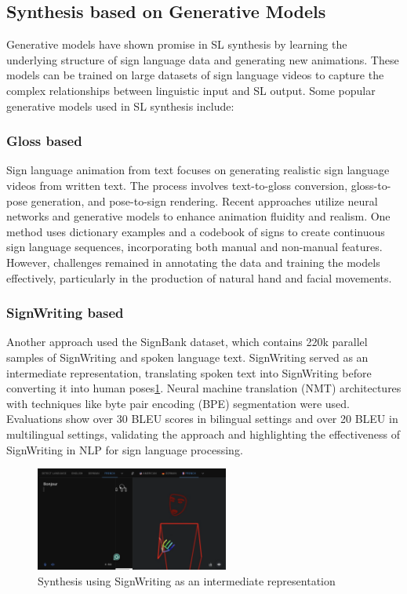 \documentclass[../../main.tex]{subfiles}
\begin{document}
\subsection{Synthesis based on Generative Models}

Generative models have shown promise in SL synthesis by learning the underlying structure of sign language data and generating new animations. These models can be trained on large datasets of sign language videos to capture the complex relationships between linguistic input and SL output. Some popular generative models used in SL synthesis include:

\subsubsection{Gloss based}

Sign language animation from text focuses on generating realistic sign language videos from written text. The process involves text-to-gloss conversion, gloss-to-pose generation, and pose-to-sign rendering. Recent approaches utilize neural networks and generative models to enhance animation fluidity and realism. One method uses dictionary examples and a codebook of signs to create continuous sign language sequences, incorporating both manual and non-manual features\cite{Walsh2024ADR}. However, challenges remained in annotating the data and training the models effectively, particularly in the production of natural hand and facial movements.

\subsubsection{SignWriting based}

Another approach\cite{jiang-etal-2023-machine} used the SignBank dataset, which contains 220k parallel samples of SignWriting and spoken language text. SignWriting served as an intermediate representation, translating spoken text into SignWriting before converting it into human poses\ref{fig:sw_synthesis}. Neural machine translation (NMT) architectures with techniques like byte pair encoding (BPE) segmentation were used. Evaluations show over 30 BLEU scores in bilingual settings and over 20 BLEU in multilingual settings, validating the approach and highlighting the effectiveness of SignWriting in NLP for sign language processing.

\begin{figure}
  \centering \includegraphics[width = 2.5in]{chapters/background_work/images/sign_writing_synthesis.png}
  \caption{Synthesis using SignWriting as an intermediate representation}
  \label{fig:sw_synthesis}
\end{figure}
\end{document}
